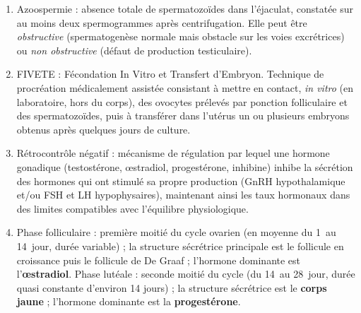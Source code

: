 \documentclass[11pt]{article}
\newcommand{\cle}[1]{{\popxbold\color{popdark}#1}}
\begin{document}
\begin{corrige}
\begin{enumerate}
    \item \cle{Azoospermie} : absence totale de spermatozoïdes dans l'éjaculat, constatée sur au moins deux spermogrammes après centrifugation. Elle peut être \emph{obstructive} (spermatogenèse normale mais obstacle sur les voies excrétrices) ou \emph{non obstructive} (défaut de production testiculaire).
    \item \cle{FIVETE} : Fécondation In Vitro et Transfert d'Embryon. Technique de procréation médicalement assistée consistant à mettre en contact, \emph{in vitro} (en laboratoire, hors du corps), des ovocytes prélevés par ponction folliculaire et des spermatozoïdes, puis à transférer dans l'utérus un ou plusieurs embryons obtenus après quelques jours de culture.
    \item \cle{Rétrocontrôle négatif} : mécanisme de régulation par lequel une hormone gonadique (testostérone, œstradiol, progestérone, inhibine) inhibe la sécrétion des hormones qui ont stimulé sa propre production (GnRH hypothalamique et/ou FSH et LH hypophysaires), maintenant ainsi les taux hormonaux dans des limites compatibles avec l'équilibre physiologique.
    \item \cle{Phase folliculaire} : première moitié du cycle ovarien (en moyenne du 1\ier\ au 14\ieme\ jour, durée variable) ; la structure sécrétrice principale est le follicule en croissance puis le follicule de De Graaf ; l'hormone dominante est l'\textbf{œstradiol}. \cle{Phase lutéale} : seconde moitié du cycle (du 14\ieme\ au 28\ieme\ jour, durée quasi constante d'environ 14 jours) ; la structure sécrétrice est le \textbf{corps jaune} ; l'hormone dominante est la \textbf{progestérone}.
\end{enumerate}
\end{corrige}
\end{document}
